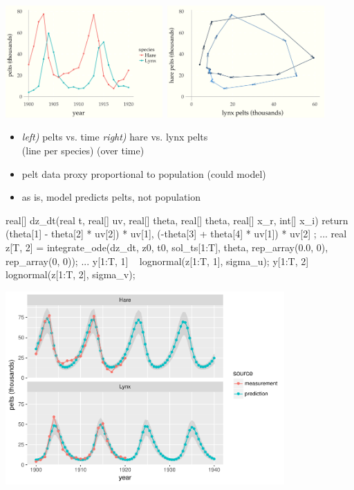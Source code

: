 \documentclass[9pt]{report}
\begin{document}
\begin{center}
\includegraphics[width=0.45\textwidth]{img/lynx-hares-1.png}~\includegraphics[width=0.45\textwidth]{img/lynx-hares-2.png}
\end{center}
\begin{itemize}
\item {\it left)} pelts vs. time \hfill
{\it right)} hare vs. lynx pelts
\\
(line per species) \hfill (over time)
\item pelt data proxy proportional to population (could model)
\item as is, model predicts pelts, not population
\end{itemize}

\begin{stancode}
real[] dz_dt(real t, real[] uv, real[] theta,
             real[] theta, real[] x_r, int[] x_i) {
  return { (theta[1] - theta[2] * uv[2]) * uv[1],
           (-theta[3] + theta[4] * uv[1]) * uv[2] };
}
...
real z[T, 2]
  = integrate_ode(dz_dt, z0, t0, sol_ts[1:T], theta,
                  rep_array(0.0, 0), rep_array(0, 0));
...
y[1:T, 1] ~ lognormal(z[1:T, 1], sigma_u);
y[1:T, 2] ~ lognormal(z[1:T, 2], sigma_v);
\end{stancode}

\begin{center}
\includegraphics[width=0.8\textwidth]{img/lotka-volterra-posterior.pdf}
\end{center}
\end{document}
